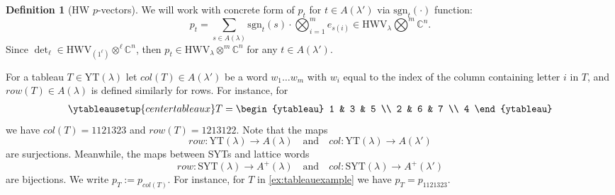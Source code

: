 \documentclass[12pt, reqno]{amsart}
\theoremstyle{definition}
\newtheorem{definition}[theorem]{Definition}
\newcommand{\sgn}{\mathrm{sgn}}
\begin{document}
\begin{definition}[HW $p$-vectors]
    We will work with concrete form of $p_t$ for $t \in A(\lambda')$ via $\sgn_t(\cdot)$ function:
    $$
        p_t = \sum_{s \in A(\lambda)} \sgn_t(s) \cdot \bigotimes_{i=1}^m e_{s(i)} \in \mathrm{HWV}_{\lambda} \bigotimes^m \mathbb{C}^n.
    $$
    Since $\det_\ell \in \mathrm{HWV}_{(1^\ell)}\otimes^\ell \mathbb{C}^n$, then $p_t \in \mathrm{HWV}_{\lambda}\otimes^m \mathbb{C}^n$ for any $t \in A(\lambda')$. %

    For a tableau $T \in \mathrm{YT}(\lambda)$ let $col(T) \in A(\lambda')$ be a word $w_1\ldots w_m$ with $w_i$ equal to the index of the column containing letter $i$ in $T$, and $row(T) \in A(\lambda)$ is defined similarly for rows.
    For instance, for
    \begin{align}\label{ex:tableauexample}
    \ytableausetup{centertableaux}
    T = \begin{ytableau}
    1 & 3 & 5 \\
    2 & 6 & 7 \\
    4
    \end{ytableau}
    \end{align}
    we have $col(T) = 1121323$ and $row(T) = 1213122$. Note that the maps 
    $$
    row:\mathrm{YT}(\lambda) \to A(\lambda)\quad\text{and}\quad col:\mathrm{YT}(\lambda) \to A(\lambda')
    $$ 
    are surjections. Meanwhile, the maps between SYTs and lattice words
    $$
    row: \mathrm{SYT}(\lambda) \to A^+(\lambda)\quad\text{and}\quad col: \mathrm{SYT}(\lambda) \to A^+(\lambda')
    $$
    are bijections. We write $p_{T} := p_{col(T)}$. For instance, for $T$ in \eqref{ex:tableauexample} we have $p_T = p_{1121323}$.
\end{definition}
\end{document}
